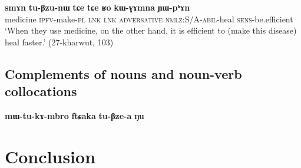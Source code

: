 \documentclass[oldfontcommands,oneside,a4paper,11pt]{article}
\newcommand{\ipa}[1]{\textbf{\phon#1}} %
\newcommand{\jpg}[2]{\ipa{#1} `#2'} %
\begin{document}
 \begin{exe}
\ex \label{ex:kWGAmna}
\gll \ipa{smɤn} 	\ipa{tu-βzu-nɯ} 	\ipa{tɕe} 	\ipa{tɕe} 	\ipa{ʁo} 	\ipa{kɯ-ɣɤmna} 	\ipa{ɲɯ-pʰɤn} \\
medicine \textsc{ipfv}-make-\textsc{pl} \textsc{lnk} \textsc{lnk} \textsc{adversative}  \textsc{nmlz:S/A}-\textsc{abil}-heal \textsc{sens}-be.efficient \\
\glt `When they use medicine, on the other hand, it is efficient to (make this disease) heal faster.' (27-kharwut, 103)
\end{exe}


% 
%
 

 

\subsection{Complements of nouns and noun-verb collocations}
\ipa{mɯ-tu-kɤ-mbro} 	\ipa{ftɕaka} 	\ipa{tu-βze-a} 	\ipa{ŋu} 

 \section{Conclusion}
 


\end{document}
